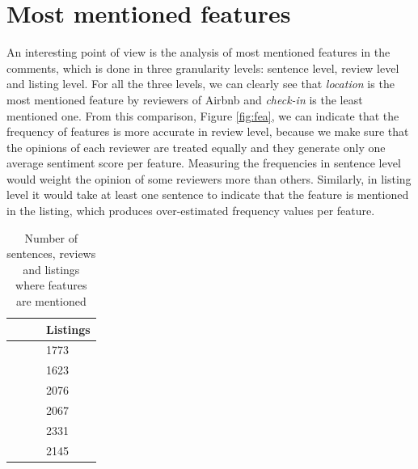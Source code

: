 \section{Most mentioned features}
An interesting point of view is the analysis of most mentioned features in the comments, which is done in three granularity levels: sentence level, review level and listing level. For all the three levels, we can clearly see that \textit{location} is the most mentioned feature by reviewers of Airbnb and \textit{check-in} is the least mentioned one. From this comparison, Figure \ref{fig:fea}, we can indicate that the frequency of features is more accurate in review level, because we make sure that the opinions of each reviewer are treated equally and they generate only one average sentiment score per feature. Measuring the frequencies in sentence level would weight the opinion of some reviewers more than others. Similarly, in listing level it would take at least one sentence to indicate that the feature is mentioned in the listing, which produces over-estimated frequency values per feature. 
\begin{table}[h!]
\footnotesize 
\centering
\begin{tabular}{|m{2.1cm}|m{2.4cm}|m{2.6cm}|m{1.15cm}|}

\hline
\centering {\textbf{}}  & \centering {\textbf{Sentences}} & \centering {\textbf{Reviews}} & {\textbf{Listings}} \\

\hline
\centering {Accuracy}  & \centering {8364} & \centering {7915} &  {1773} \\ \hline

 \centering {Check-in} & \centering {5818} & \centering  {5454} & {1623}\\ \hline
 
 \centering {Cleanliness} & \centering {18440} & \centering {17757} & {2076}\\ \hline
 
\centering  {Communication} & \centering {16894} & \centering {14610} & {2067} \\ \hline

\centering {Location} & \centering {69616} & \centering {44539} & {2331}\\ \hline

\centering {Value} & \centering {19862} & \centering {18811} & {2145}\\ \hline
\end{tabular}
\caption{Number of sentences, reviews and listings where features are mentioned}
\label{res1}
\end{table}

